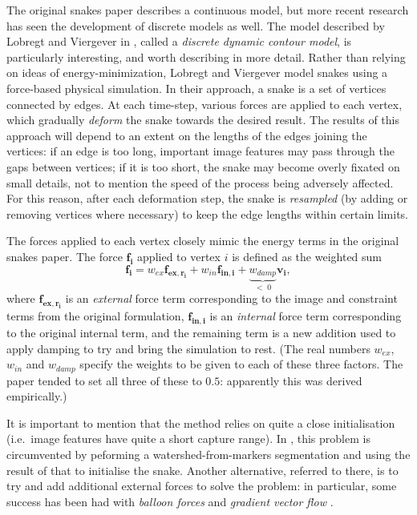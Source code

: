 The original snakes paper describes a continuous model, but more recent research \cite{lobregt95,miller90b,miller90a} has seen the development of discrete models as well. The model described by Lobregt and Viergever in \cite{lobregt95}, called a \emph{discrete dynamic contour model}, is particularly interesting, and worth describing in more detail. Rather than relying on ideas of energy-minimization, Lobregt and Viergever model snakes using a force-based physical simulation. In their approach, a snake is a set of vertices connected by edges. At each time-step, various forces are applied to each vertex, which gradually \emph{deform} the snake towards the desired result. The results of this approach will depend to an extent on the lengths of the edges joining the vertices: if an edge is too long, important image features may pass through the gaps between vertices; if it is too short, the snake may become overly fixated on small details, not to mention the speed of the process being adversely affected. For this reason, after each deformation step, the snake is \emph{resampled} (by adding or removing vertices where necessary) to keep the edge lengths within certain limits.

The forces applied to each vertex closely mimic the energy terms in the original snakes paper. The force $\mathbf{f_i}$ applied to vertex $i$ is defined as the weighted sum
%
\[
\mathbf{f_i} = w_{ex}\mathbf{f_{ex,r_i}} + w_{in}\mathbf{f_{in,i}} + \underbrace{w_{damp}}_{< \; 0}\mathbf{v_i},
\]
%
where $\mathbf{f_{ex,r_i}}$ is an \emph{external} force term corresponding to the image and constraint terms from the original formulation, $\mathbf{f_{in,i}}$ is an \emph{internal} force term corresponding to the original internal term, and the remaining term is a new addition used to apply damping to try and bring the simulation to rest. (The real numbers $w_{ex}$, $w_{in}$ and $w_{damp}$ specify the weights to be given to each of these three factors. The paper tended to set all three of these to $0.5$: apparently this was derived empirically.)

It is important to mention that the method relies on quite a close initialisation (i.e.\ image features have quite a short capture range). In \cite{ree05}, this problem is circumvented by peforming a watershed-from-markers segmentation and using the result of that to initialise the snake. Another alternative, referred to there, is to try and add additional external forces to solve the problem: in particular, some success has been had with \emph{balloon forces} \cite{cohen91} and \emph{gradient vector flow} \cite{xu98}.

